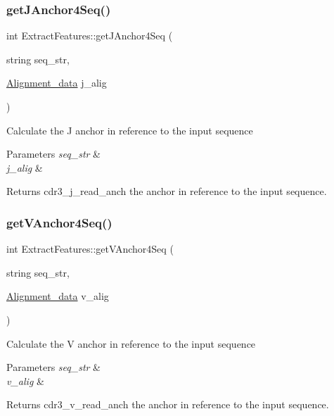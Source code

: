 \subsubsection{\texorpdfstring{get\+J\+Anchor4\+Seq()}{getJAnchor4Seq()}}
{\footnotesize\ttfamily int Extract\+Features\+::get\+J\+Anchor4\+Seq (\begin{DoxyParamCaption}\item[{string}]{seq\+\_\+str,  }\item[{\hyperlink{structAlignment__data}{Alignment\+\_\+data}}]{j\+\_\+alig }\end{DoxyParamCaption})}

Calculate the J anchor in reference to the input sequence 
\begin{DoxyParams}{Parameters}
{\em seq\+\_\+str} & \\
\hline
{\em j\+\_\+alig} & \\
\hline
\end{DoxyParams}
\begin{DoxyReturn}{Returns}
cdr3\+\_\+j\+\_\+read\+\_\+anch the anchor in reference to the input sequence. 
\end{DoxyReturn}
\mbox{\label{classExtractFeatures_a5d1a024949397722223c20d3fc5e6fd4}} 
\subsubsection{\texorpdfstring{get\+V\+Anchor4\+Seq()}{getVAnchor4Seq()}}
{\footnotesize\ttfamily int Extract\+Features\+::get\+V\+Anchor4\+Seq (\begin{DoxyParamCaption}\item[{string}]{seq\+\_\+str,  }\item[{\hyperlink{structAlignment__data}{Alignment\+\_\+data}}]{v\+\_\+alig }\end{DoxyParamCaption})}

Calculate the V anchor in reference to the input sequence 
\begin{DoxyParams}{Parameters}
{\em seq\+\_\+str} & \\
\hline
{\em v\+\_\+alig} & \\
\hline
\end{DoxyParams}
\begin{DoxyReturn}{Returns}
cdr3\+\_\+v\+\_\+read\+\_\+anch the anchor in reference to the input sequence. 
\end{DoxyReturn}
\mbox{\label{classExtractFeatures_a05f401f4f39adb7f33c2b1e3f7f51807}} 
